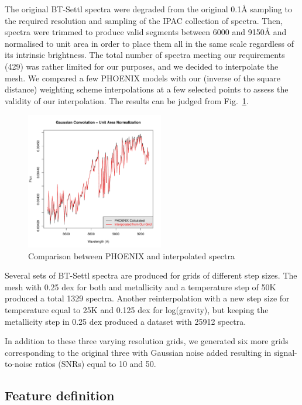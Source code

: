 The original BT-Settl spectra were degraded from the original 0.1{\AA}
sampling to the required resolution and sampling of the IPAC
collection of spectra.  Then, spectra were trimmed to produce valid
segments between 6000 and 9150{\AA} and normalised to unit area in
order to place them all in the same scale regardless of its intrinsic
brightness. The total number of spectra meeting our requirements (429)
was rather limited for our purposes, and we decided to interpolate the
mesh. We compared a few PHOENIX \cite{fuhrmeister2005phoenix} models
with our (inverse of the square distance) weighting scheme
interpolations at a few selected points to assess the validity of our
interpolation. The results can be judged from
Fig.~\ref{fig:comp_gen_inter}.


\begin {figure}
 \begin{center}
 \includegraphics[width=6cm]{figs/intgrid4_gauss.pdf}
 \caption{Comparison between PHOENIX and interpolated spectra}
 \label{fig:comp_gen_inter}
 \end{center}
\end {figure}


Several sets of BT-Settl spectra are produced for grids of different
step sizes. The mesh with 0.25 dex for both \logg and metallicity and
a temperature step of 50K produced a total 1329 spectra.  Another
reinterpolation with a new step size for temperature equal to 25K and
0.125 dex for log(gravity), but keeping the metallicity step in 0.25
dex produced a dataset with 25912 spectra.

In addition to these three varying resolution grids, we generated six
more grids corresponding to the original three with Gaussian noise
added resulting in signal-to-noise ratios (SNRs) equal to 10 and 50.

\subsection{Feature definition}
\label{subsec:FD}

